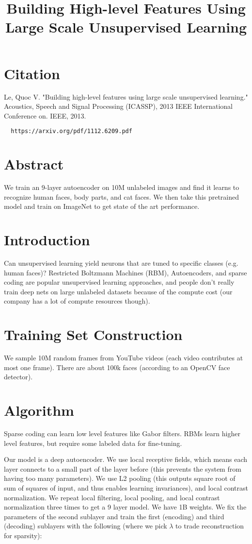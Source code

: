 \documentclass[a4paper]{article}
\title{Building High-level Features
Using Large Scale Unsupervised Learning}
\date{}
\begin{document}
\maketitle

\section{Citation}
Le, Quoc V. "Building high-level features using large scale unsupervised learning." Acoustics, Speech and Signal Processing (ICASSP), 2013 IEEE International Conference on. IEEE, 2013.

\begin{verbatim}
  https://arxiv.org/pdf/1112.6209.pdf
\end{verbatim}

\section{Abstract}
We train an 9-layer autoencoder on 10M unlabeled images and find it learns to
recognize human faces, body parts, and cat faces. We then take this pretrained
model and train on ImageNet to get state of the art performance.

\section{Introduction}
Can unsupervised learning yield neurons that are tuned to specific classes (e.g.
human faces)? Restricted Boltzmann Machines (RBM), Autoencoders, and sparse
coding are popular unsupervised learning approaches, and people don't really
train deep nets on large unlabeled datasets because of the compute cost (our
company has a lot of compute resources though).

\section{Training Set Construction}
We sample 10M random frames from YouTube videos (each video contributes at most
one frame). There are about 100k faces (according to an OpenCV face detector).

\section{Algorithm}
Sparse coding can learn low level features like Gabor filters. RBMs learn
higher level features, but require some labeled data for fine-tuning.

Our model is a deep autoencoder. We use local receptive fields, which means
each layer connects to a small part of the layer before (this prevents
the system from having too many parameters). We use L2 pooling (this outputs
square root of sum of squares of input, and thus enables
learning invariances), and local contrast normalization. We repeat local
filtering, local pooling, and local contrast normalization three times to
get a 9 layer model. We have 1B weights. We fix the parameters of the second
sublayer and train the first (encoding) and third (decoding) sublayers with
the following (where we pick $\lambda$ to trade reconstruction for sparsity):
\end{document}
